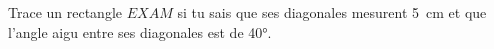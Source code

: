 %
%
    Trace un rectangle \(EXAM\) si tu sais que ses diagonales mesurent \SI{5}{cm} et que l'angle aigu entre ses diagonales est de \ang{40}.
